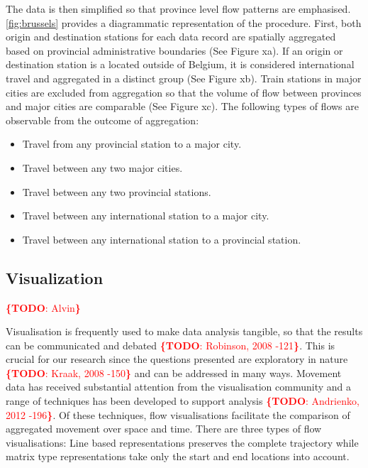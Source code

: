 \documentclass{sig-alternate}
\newcommand{\todo}[1]{\noindent\textcolor{red}{{\bf \{TODO}: #1{\bf \}}}}
\begin{document}
The data is then simplified so that province level flow patterns are emphasised.
\cref{fig:brussels} provides a diagrammatic representation of the procedure.
First, both origin and destination stations for each data record are spatially aggregated based on provincial administrative boundaries (See Figure xa).
If an origin or destination station is a located outside of Belgium, it is considered international travel and aggregated in a distinct group (See Figure xb).
Train stations in major cities are excluded from aggregation so that the volume of flow between provinces and major cities are comparable (See Figure xc).
The following types of flows are observable from the outcome of aggregation:

\begin{itemize}
  \item Travel from any provincial station to a major city.
  \item Travel between any two major cities.
  \item Travel between any two provincial stations.
  \item Travel between any international station to a major city.
  \item Travel between any international station to a provincial station.
\end{itemize}

\subsection{Visualization}

\todo{Alvin}

Visualisation is frequently used to make data analysis tangible, so that the results can be communicated and debated \todo{Robinson, 2008 -121}. This is crucial for our research since the questions presented are exploratory in nature \todo{Kraak, 2008 -150} and can be addressed in many ways. Movement data has received substantial attention from the visualisation community and a range of techniques has been developed to support analysis \todo{Andrienko, 2012 -196}. Of these techniques, flow visualisations facilitate the comparison of aggregated movement over space and time. There are three types of flow visualisations: Line based representations preserves the complete trajectory while matrix type representations take only the start and end locations into account.
\end{document}
